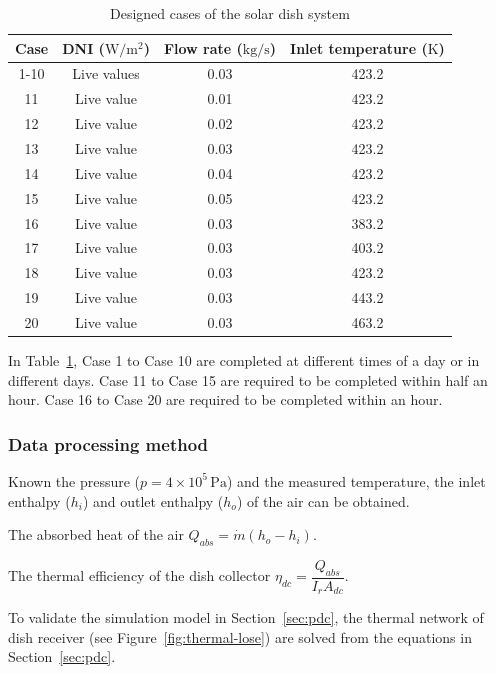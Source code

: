 \begin{table}[htbp]\footnotesize
	\caption{Designed cases of the solar dish system}
	\begin{center}
	\begin{tabular}{cccc}
		\toprule
		Case	& DNI ($\mathrm{W/m^2}$)	&	Flow rate ($\mathrm{kg/s}$)			&	Inlet temperature ($\mathrm{K}$)\\
		\midrule
		1-10	&	Live values	&	0.03	&	423.2\\
		11	&	Live value	&	0.01	&	423.2\\
		12	&	Live value	&	0.02	&	423.2\\
		13	&	Live value	&	0.03	&	423.2\\
		14	&	Live value	&	0.04	&	423.2\\
		15	&	Live value	&	0.05	&	423.2\\
		16	&	Live value	&	0.03	&	383.2\\
		17	&	Live value	&	0.03	&	403.2\\
		18	&	Live value	&	0.03	&	423.2\\
		19	&	Live value	&	0.03	&	443.2\\
		20	&	Live value	&	0.03	&	463.2\\
		\bottomrule
	\end{tabular}
	\end{center}
	\label{tab:DesignedCasesForDish}
\end{table}

In Table~\ref{tab:DesignedCasesForDish}, Case 1 to Case 10 are completed at different times of a day or in different days. Case 11 to Case 15 are required to be completed within half an hour. Case 16 to Case 20 are required to be completed within an hour.

\subsubsection{Data processing method}
Known the pressure ($p = 4\times10^5\,\mathrm{Pa}$) and the measured temperature, the inlet enthalpy ($h_i$) and outlet enthalpy ($h_o$) of the air can be obtained.

The absorbed heat of the air $Q_{abs} = \dot{m}(h_o - h_i)$.

The thermal efficiency of the dish collector $\eta_{dc} = \dfrac{Q_{abs}}{I_r A_{dc}}$. 

To validate the simulation model in Section~\ref{sec:pdc}, %
the thermal network of dish receiver (see Figure~\ref{fig:thermal-lose}) are solved from the equations in Section~\ref{sec:pdc}.

